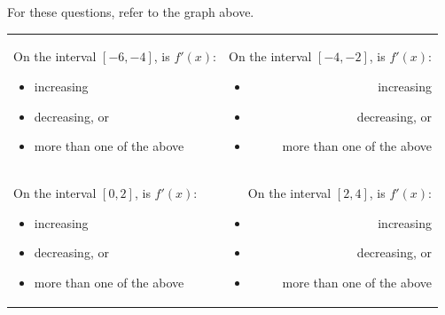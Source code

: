 \documentclass[handout]{ximera}
\begin{document}
\begin{problem}
For these questions, refer to the graph above.


\begin{enumerate}

\begin{tabular}{lr}


\begin{minipage}[t]{.5\textwidth}
\item On the interval $[-6, -4]$, is $f'(x)$:\hspace{1cm}\hspace{1cm}
\begin{itemize}
\item increasing
\item decreasing, or
\item more than one of the above
\end{itemize}
\end{minipage}

&

\begin{minipage}[t]{.5\textwidth}
\item On the interval $[-4, -2]$, is $f'(x)$:
\begin{itemize}
\item increasing
\item decreasing, or
\item more than one of the above
\end{itemize}
\end{minipage}

\\

\begin{minipage}[t]{.5\textwidth}
\item On the interval $[0, 2]$, is $f'(x)$:
\begin{itemize}
\item increasing
\item decreasing, or
\item more than one of the above
\end{itemize}
\end{minipage}

&

\begin{minipage}[t]{.5\textwidth}
\item On the interval $[2, 4]$, is $f'(x)$:
\begin{itemize}
\item increasing
\item decreasing, or
\item more than one of the above
\end{itemize}
\end{minipage}

\end{tabular}

\end{enumerate}

\end{problem}
\end{document}

